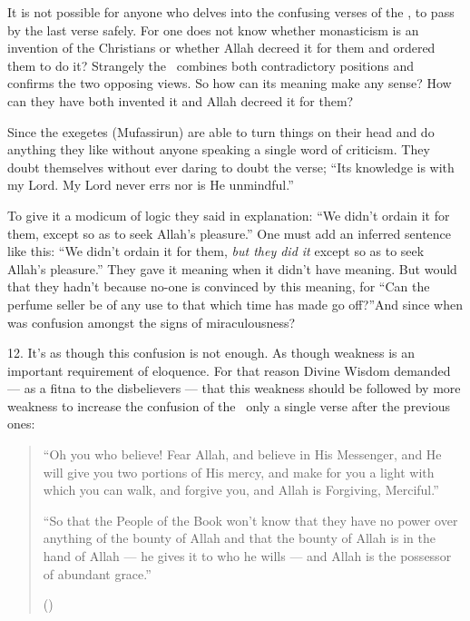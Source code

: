 \documentclass[12pt]{memoir}
\begin{document}
It is not possible for anyone who delves into
the confusing verses of the \Quran, to pass by the last verse safely.
For one does not know whether monasticism is an invention of the Christians
or whether Allah decreed it for them and ordered them to do it?
Strangely the \Quran\ combines both contradictory positions
and confirms the two opposing views.
So how can its meaning make any sense?
How can they have both invented it and Allah decreed it for them?

Since the exegetes (Mufassirun) are able to turn things on their head
and do anything they like without anyone speaking a single word of criticism.
They doubt themselves without ever daring to doubt the verse;
“Its knowledge is with my Lord. My Lord never errs nor is He unmindful.”

To give it a modicum of logic they said in explanation:
“We didn’t ordain it for them, except so as to seek Allah’s pleasure.”
One must add an inferred sentence like this:
“We didn’t ordain it for them,
\emph{but they did it} except so as to seek Allah’s pleasure.”
They gave it meaning when it didn’t have meaning.
But would that they hadn’t because no-one is convinced by this meaning,
for “Can the perfume seller be of any use to
that which time has made go off?”\fnmarksym[*]
And since when was confusion amongst the signs of miraculousness?


12. It’s as though this confusion is not enough.
As though weakness is an important requirement of eloquence.
For that reason Divine Wisdom demanded — as a fitna to the disbelievers —
that this weakness should be followed by more weakness to increase
the confusion of the \Quran\ only a single verse after the previous ones:

\begin{quote}
“Oh you who believe! Fear Allah, and believe in His Messenger,
and He will give you two portions of His mercy,
and make for you a light with which you can walk,
and forgive you, and Allah is Forgiving, Merciful.”

“So that the People of the Book won’t know that they have no power
over anything of the bounty of Allah and that the bounty of Allah
is in the hand of Allah — he gives it to who he wills —
and Allah is the possessor of abundant grace.”

()
\end{quote}
\end{document}
